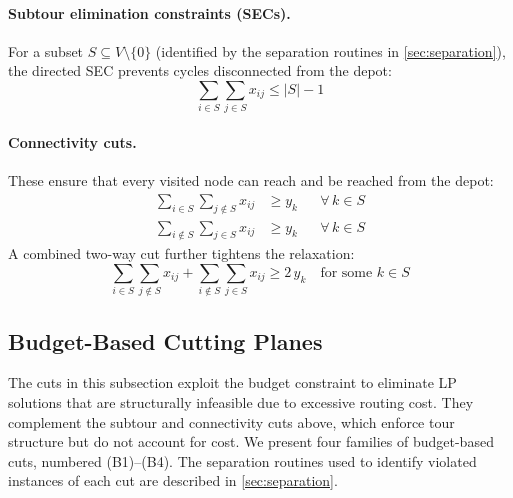 \documentclass[11pt,a4paper]{article}
\begin{document}
\paragraph{Subtour elimination constraints (SECs).}
For a subset $S \subseteq V \setminus \{0\}$ (identified by the separation routines in \cref{sec:separation}), the directed SEC prevents cycles disconnected from the depot:
\begin{equation}
  \sum_{i \in S} \sum_{j \in S} x_{ij} \leq |S| - 1
  \label{eq:sec}
\end{equation}

\paragraph{Connectivity cuts.}
These ensure that every visited node can reach and be reached from the depot:
\begin{align}
  \sum_{i \in S} \sum_{j \notin S} x_{ij} &\geq y_k && \forall\, k \in S \label{eq:outcut} \\
  \sum_{i \notin S} \sum_{j \in S} x_{ij} &\geq y_k && \forall\, k \in S \label{eq:incut}
\end{align}
A combined two-way cut further tightens the relaxation:
\begin{equation}
  \sum_{i \in S} \sum_{j \notin S} x_{ij} + \sum_{i \notin S} \sum_{j \in S} x_{ij} \geq 2\, y_k \quad \text{for some } k \in S
  \label{eq:twocut}
\end{equation}

\subsection{Budget-Based Cutting Planes}

The cuts in this subsection exploit the budget constraint to eliminate LP solutions that are structurally infeasible due to excessive routing cost.
They complement the subtour and connectivity cuts above, which enforce tour structure but do not account for cost.
We present four families of budget-based cuts, numbered (B1)--(B4).
The separation routines used to identify violated instances of each cut are described in \cref{sec:separation}.
\end{document}

